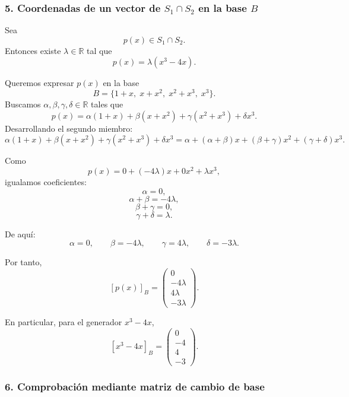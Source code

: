 \documentclass[12pt]{article}
\begin{document}
\subsubsection*{5. Coordenadas de un vector de \(S_1\cap S_2\) en la base \(B\)}

Sea
\[
p(x)\in S_1\cap S_2.
\]
Entonces existe \(\lambda\in\mathbb{R}\) tal que
\[
p(x)=\lambda(x^3-4x).
\]

Queremos expresar \(p(x)\) en la base
\[
B=\{1+x,\;x+x^2,\;x^2+x^3,\;x^3\}.
\]
Buscamos \(\alpha,\beta,\gamma,\delta\in\mathbb{R}\) tales que
\[
p(x)=\alpha(1+x)+\beta(x+x^2)+\gamma(x^2+x^3)+\delta x^3.
\]
Desarrollando el segundo miembro:
\[
\alpha(1+x)+\beta(x+x^2)+\gamma(x^2+x^3)+\delta x^3
=
\alpha+(\alpha+\beta)x+(\beta+\gamma)x^2+(\gamma+\delta)x^3.
\]

Como
\[
p(x)=0+(-4\lambda)x+0x^2+\lambda x^3,
\]
igualamos coeficientes:
\[
\alpha=0,
\]
\[
\alpha+\beta=-4\lambda,
\]
\[
\beta+\gamma=0,
\]
\[
\gamma+\delta=\lambda.
\]

De aquí:
\[
\alpha=0,\qquad \beta=-4\lambda,\qquad \gamma=4\lambda,\qquad \delta=-3\lambda.
\]

Por tanto,
\[
[p(x)]_B=
\begin{pmatrix}
0\\
-4\lambda\\
4\lambda\\
-3\lambda
\end{pmatrix}.
\]

En particular, para el generador \(x^3-4x\),
\[
[x^3-4x]_B=
\begin{pmatrix}
0\\
-4\\
4\\
-3
\end{pmatrix}.
\]

\subsubsection*{6. Comprobación mediante matriz de cambio de base}
\end{document}
